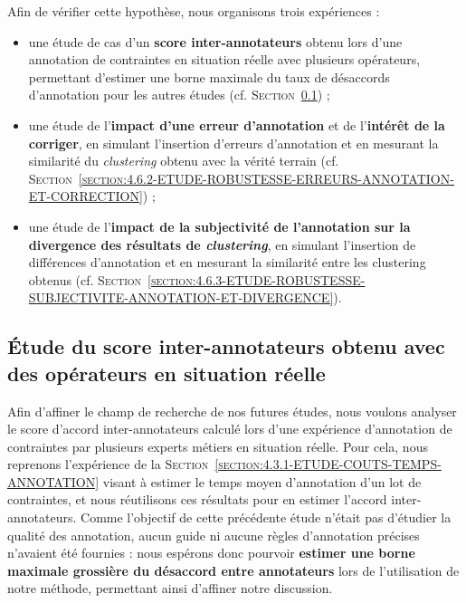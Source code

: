 	
	Afin de vérifier cette hypothèse, nous organisons trois expériences :
	\begin{itemize}
		\item une étude de cas d'un \textbf{score inter-annotateurs} obtenu lors d'une annotation de contraintes en situation réelle avec plusieurs opérateurs, permettant d'estimer une borne maximale du taux de désaccords d'annotation pour les autres études (cf. \textsc{Section~\ref{section:4.6.1-ETUDE-ROBUSTESSE-SCORE-ACCORD}}) ;
		\item une étude de l'\textbf{impact d'une erreur d'annotation} et de l'\textbf{intérêt de la corriger}, en simulant l'insertion d'erreurs d'annotation et en mesurant la similarité du \textit{clustering} obtenu avec la vérité terrain (cf. \textsc{Section~\ref{section:4.6.2-ETUDE-ROBUSTESSE-ERREURS-ANNOTATION-ET-CORRECTION}}) ;
		\item une étude de l'\textbf{impact de la subjectivité de l'annotation sur la divergence des résultats de \textit{clustering}}, en simulant l'insertion de différences d'annotation et en mesurant la similarité entre les clustering obtenus (cf. \textsc{Section~\ref{section:4.6.3-ETUDE-ROBUSTESSE-SUBJECTIVITE-ANNOTATION-ET-DIVERGENCE}}).
	\end{itemize}
		
		
	\subsection{Étude du score inter-annotateurs obtenu avec des opérateurs en situation réelle}
	\label{section:4.6.1-ETUDE-ROBUSTESSE-SCORE-ACCORD}
		
		Afin d'affiner le champ de recherche de nos futures études, nous voulons analyser le score d'accord inter-annotateurs calculé lors d'une expérience d'annotation de contraintes par plusieurs experts métiers en situation réelle.
		Pour cela, nous reprenons l'expérience de la \textsc{Section~\ref{section:4.3.1-ETUDE-COUTS-TEMPS-ANNOTATION}} visant à estimer le temps moyen d'annotation d'un lot de contraintes, et nous réutilisons ces résultats pour en estimer l'accord inter-annotateurs.
		Comme l'objectif de cette précédente étude n'était pas d'étudier la qualité des annotation, aucun guide ni aucune règles d'annotation précises n'avaient été fournies : nous espérons donc pourvoir \textbf{estimer une borne maximale grossière du désaccord entre annotateurs} lors de l'utilisation de notre méthode, permettant ainsi d'affiner notre discussion.
		
